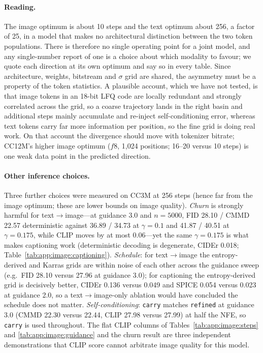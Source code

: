 \paragraph{Reading.} The image optimum is about 10 steps and the text optimum about 256, a factor
of 25, in a model that makes no architectural distinction between the two token populations.
There is therefore no single operating point for a joint model, and any single-number report of
one is a choice about which modality to favour; we quote each direction at its own optimum and
say so in every table. Since architecture, weights, bitstream and $\sigma$ grid are shared, the
asymmetry must be a property of the token statistics. A plausible account, which we have not
tested, is that image tokens in an 18-bit LFQ code are locally redundant and strongly correlated
across the grid, so a coarse trajectory lands in the right basin and additional steps mainly
accumulate and re-inject self-conditioning error, whereas text tokens carry far more information
per position, so the fine grid is doing real work. On that account the divergence should move
with tokenizer bitrate; CC12M's higher image optimum ($f8$, 1{,}024 positions; 16--20 versus 10
steps) is one weak data point in the predicted direction.

\paragraph{Other inference choices.} Three further choices were measured on CC3M at 256 steps
(hence far from the image optimum; these are lower bounds on image quality). \emph{Churn} is
strongly harmful for text$\rightarrow$image---at guidance 3.0 and $n{=}5000$, FID 28.10 / CMMD
22.57 deterministic against 36.89 / 34.73 at $\gamma{=}0.1$ and 41.87 / 40.51 at
$\gamma{=}0.175$, while CLIP moves by at most 0.06---yet the same $\gamma{=}0.175$ is what makes
captioning work (deterministic decoding is degenerate, CIDEr 0.018;
Table~\ref{tab:app:image:captioning}). \emph{Schedule}: for text$\rightarrow$image the
entropy-derived and Karras grids are within noise of each other across the guidance sweep (e.g.\
FID 28.10 versus 27.96 at guidance 3.0); for captioning the entropy-derived grid is decisively
better, CIDEr 0.136 versus 0.049 and SPICE 0.054 versus 0.023 at guidance 2.0, so a
text$\rightarrow$image-only ablation would have concluded the schedule does not matter.
\emph{Self-conditioning}: \texttt{carry} matches \texttt{refined} at guidance 3.0 (CMMD 22.30
versus 22.44, CLIP 27.98 versus 27.99) at half the NFE, so \texttt{carry} is used throughout. The
flat CLIP columns of Tables~\ref{tab:app:image:steps} and \ref{tab:app:image:guidance} and the
churn result are three independent demonstrations that CLIP score cannot arbitrate image quality
for this model.

